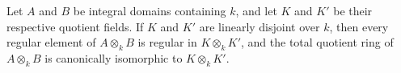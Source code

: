 Let $A$ and $B$ be integral domains containing $k$, and let $K$ and $K'$ be their respective quotient fields. If $K$ and $K'$ are linearly disjoint over $k$, then every regular element of $A \otimes_k B$ is regular in $K \otimes_k K'$, and the total quotient ring of $A \otimes_k B$ is canonically isomorphic to $K \otimes_k K'$.
